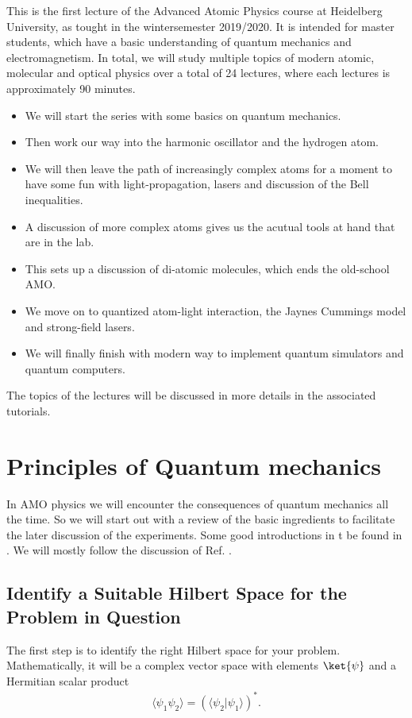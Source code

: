 This is the first lecture of the Advanced Atomic Physics course at Heidelberg University, as tought in the wintersemester 2019/2020.
It is intended for master students, which have a basic understanding of quantum mechanics and electromagnetism. In total, we will study multiple topics of modern atomic, molecular and optical physics over a total of 24 lectures, where each lectures is approximately 90 minutes. 
\begin{itemize}
\item We will start the series with some basics on quantum mechanics.
\item Then work our way into the harmonic oscillator and the hydrogen atom.
\item We will then leave the path of increasingly complex atoms for a moment to have some fun with light-propagation, lasers and discussion of the Bell inequalities.
\item A discussion of more complex atoms gives us the acutual tools at hand that are in the lab.
\item This sets up a discussion of di-atomic molecules, which ends the old-school AMO.
\item We move on to quantized atom-light interaction, the Jaynes Cummings model and strong-field lasers.
\item We will finally finish with modern way to implement quantum simulators and quantum computers.
\end{itemize}

The topics of the lectures will be discussed in more details in the associated tutorials. 

\section{Principles of Quantum mechanics}
In AMO physics we will encounter the consequences of quantum mechanics all the time. So we will start out with a review of the basic ingredients to facilitate the later discussion of the experiments. 
Some good introductions in t be found in \cite{2002, 2006} \cite{1}\cite{2}. We will mostly follow the discussion of Ref. \cite{2006}.

\subsection{Identify a Suitable Hilbert Space for the Problem in Question}
The first step is to identify the right Hilbert space for your problem. Mathematically, it will be a complex vector space with elements $\ket{\psi}$ and a Hermitian scalar product
\begin{align}
				\langle\psi_1 \psi_2\rangle=(\langle{\psi_2}| \psi_1\rangle)^*.
\end{align}

